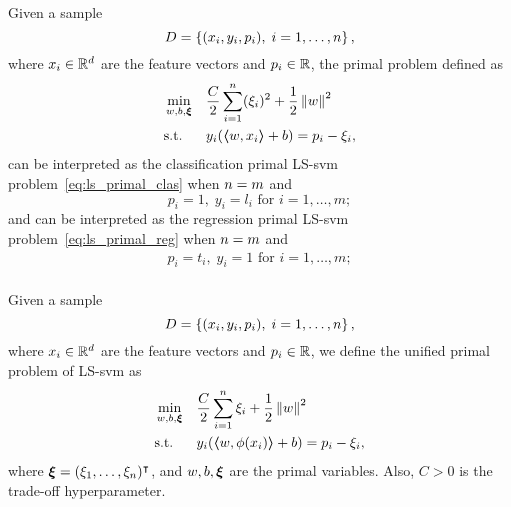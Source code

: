 \begin{lemma}
    Given a sample
    $$ D = \left\{(x_i, y_i, p_i), \; i=1, \ldots, n\right\} ,$$
    where $x_i \in \mathbb{R}^d$ are the feature vectors and $p_i \in \mathbb{R}$, 
    the primal problem defined as
    \begin{equation}
        \nonumber
        \begin{aligned}
            &\min_{w, b, \bm{\xi}} & & \frac{C}{2} \sum_{i=1}^n (\xi_i)^2 + \frac{1}{2} \left\lVert w\right\rVert^2 \\
            & \text{s.t.} & & y_i (\bm{\left\langle} w, x_i \bm{\right\rangle} + b) = p_i - \xi_i ,     
        \end{aligned}  
    \end{equation}
    can be interpreted as the classification primal LS-\acrshort{svm} problem~\eqref{eq:ls_primal_clas} when $n=m$ and
    $$ p_i = 1,\; y_i = l_i \text{ for } i=1, \ldots, m ;$$
    and can be interpreted as the regression primal LS-\acrshort{svm} problem~\eqref{eq:ls_primal_reg} when $n = m$ and
    \begin{equation}
        \nonumber
        \begin{aligned}
            p_i = t_i  ,\; y_i = 1 \text{ for } i=1, \ldots, m ; \\
        \end{aligned}
    \end{equation}
\end{lemma}
%
\begin{definition}
    Given a sample
    $$ D = \left\{(x_i, y_i, p_i), \; i=1, \ldots, n\right\} ,$$
    where $x_i \in \mathbb{R}^d$ are the feature vectors and $p_i \in \mathbb{R}$, 
    we define the unified primal problem of LS-\acrshort{svm} as
    \begin{equation}
        \label{eq:ls_primal}
        \begin{aligned}
            &\min_{w, b, \fv{\xi}} & & \frac{C}{2} \sum_{i=1}^\nsamples \xi_i + \frac{1}{2} \norm{w}^2 \\
            & \text{s.t.} & & y_i (\dotp{w}{\phi(x_i)} + b) = p_i - \xi_i ,      
        \end{aligned}  
    \end{equation}
    where $\bm{\xi} = (\xi_1, \ldots, \xi_n)^\intercal$, and $w, b, \bm{\xi}$ are the primal variables. Also, $C > 0$ is the trade-off hyperparameter.
\end{definition}
